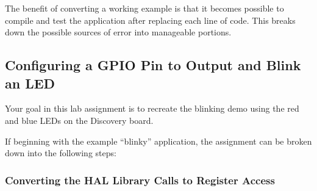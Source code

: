 \documentclass[11pt,fleqn]{book} %
\begin{document}
The benefit of converting a working example is that it becomes possible to compile and test the application after replacing each line of code. This breaks down the possible sources of error into manageable portions. 

\subsection{Configuring a GPIO Pin to Output and Blink an LED}

Your goal in this lab assignment is to recreate the blinking demo using the red and blue LEDs on the Discovery board. 

If beginning with the example ``blinky'' application, the assignment can be broken down into the following steps:

\subsubsection{Converting the HAL Library Calls to Register Access}
\end{document}
